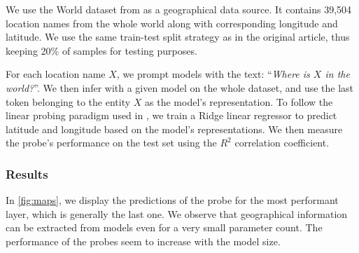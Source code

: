 We use the World dataset from \citet{gurnee2023language} as a geographical data source. It contains 39,504 location names from the whole world along with corresponding longitude and latitude. We use the same train-test split strategy as in the original article, thus keeping 20\% of samples for testing purposes.

For each location name $X$, we prompt models with the text: ``\textit{Where is $X$ in the world?}''. We then infer with a given model on the whole dataset, and use the last token belonging to the entity $X$ as the model's representation. To follow the linear probing paradigm used in \citet{gurnee2023language}, we train a Ridge linear regressor \citep{ridge} to predict latitude and longitude based on the model's representations. We then measure the probe's performance on the test set using the $R^2$ correlation coefficient.

\subsubsection{Results}
In \autoref{fig:maps}, we display the predictions of the probe for the most performant layer, which is generally the last one. We observe that geographical information can be extracted from models even for a very small parameter count. The performance of the probes seem to increase with the model size.

